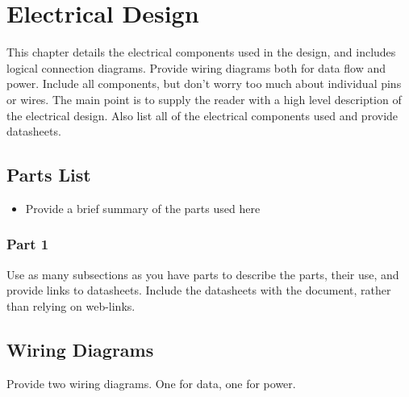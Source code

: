 
\chapter{Electrical Design}
\label{chap:elecdesign}

This chapter details the electrical components used in the design, and includes logical connection diagrams. Provide wiring diagrams both for data flow and power. Include all components, but don't worry too much about individual pins or wires. The main point is to supply the reader with a high level description of the electrical design. Also list all of the electrical components used and provide datasheets.

\section{Parts List}

\begin{itemize}
	\item{Provide a brief summary of the parts used here}
\end{itemize}

\subsection{Part 1}

Use as many subsections as you have parts to describe the parts, their use, and provide links to datasheets. Include the datasheets with the document, rather than relying on web-links.
\section{Wiring Diagrams}

Provide two wiring diagrams. One for data, one for power.



